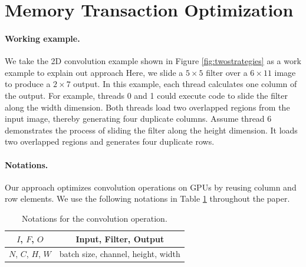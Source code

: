 \section{Memory Transaction Optimization}
\label{sec:strategies}

\paragraph{Working example.} We take the 2D convolution example shown in Figure \ref{fig:twostrategies} as a work example to explain out approach Here, we slide a $5
\times 5$ filter over a $6 \times 11$ image to produce a $2 \times 7$ output. In this example, each thread calculates one column of the
output. For example, threads 0 and 1 could execute code to slide the filter along the width dimension. Both threads load two overlapped
regions from the input image, thereby generating four duplicate columns. Assume thread 6 demonstrates the process of sliding the filter
along the height dimension. It loads two overlapped regions and generates four duplicate rows.


\paragraph{Notations.} Our approach optimizes convolution operations on GPUs by reusing column and row elements. We use the following notations in Table
\ref{tab:notations} throughout the paper.

\begin{table}[t!]
\caption{Notations for the convolution operation.}
	\begin{tabular}{c|c}
	\hline
		$I$, $F$, $O$ & Input, Filter, Output \\
		\hline
		$N$, $C$, $H$, $W$ & batch size, channel, height, width\\
		\hline
	\end{tabular}
	\label{tab:notations}
\end{table}

